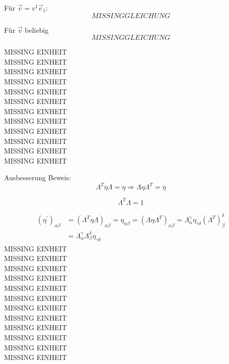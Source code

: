 \documentclass[a4paper, 11pt]{article}
\numberwithin{equation}{section}
\begin{document}
Für $\vec{v}= v^1\vec{e}_1$:
\begin{equation}
MISSING GLEICHUNG
\end{equation}

Für $\vec{v}$ beliebig
\begin{equation}
MISSING GLEICHUNG
\end{equation}

\newpage
MISSING EINHEIT \\
MISSING EINHEIT \\
MISSING EINHEIT \\
MISSING EINHEIT \\
MISSING EINHEIT \\
MISSING EINHEIT \\
MISSING EINHEIT \\
MISSING EINHEIT \\
MISSING EINHEIT \\
MISSING EINHEIT \\
MISSING EINHEIT \\
MISSING EINHEIT

Ausbesserung Beweis:
\begin{equation*}
\Lambda^T \eta \Lambda = \eta  \Rightarrow \Lambda \eta \Lambda^T = \eta
\end{equation*}

\begin{equation*}
\Lambda^T \Lambda = 1
\end{equation*}

\begin{align*}
\left( \eta^\prime \right)_{\alpha \beta} &= \left( \Lambda^T \eta \Lambda \right)_{\alpha \beta} = \eta_{\alpha \beta} = \left( \Lambda \eta \Lambda^T \right)_{\alpha \beta} = \Lambda_\alpha^\gamma \eta_{\gamma \delta} \left( \Lambda^T \right)^\delta_\beta\\
&= \Lambda_\alpha^\gamma \Lambda_\beta^\delta \eta_{\gamma \delta}
\end{align*}
MISSING EINHEIT \\
MISSING EINHEIT \\
MISSING EINHEIT \\
MISSING EINHEIT \\
MISSING EINHEIT \\
MISSING EINHEIT \\
MISSING EINHEIT \\
MISSING EINHEIT \\
MISSING EINHEIT \\
MISSING EINHEIT \\
MISSING EINHEIT \\
MISSING EINHEIT
\end{document}
